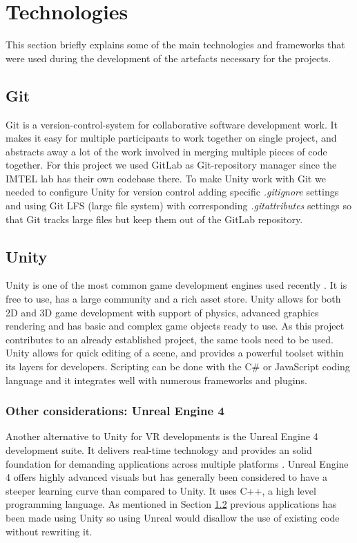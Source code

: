 \section{Technologies}
\label{sec:technologies}
This section briefly explains some of the main technologies and frameworks that were used during the development of the artefacts necessary for the projects. 

\subsection{Git}
Git is a version-control-system for collaborative software development work. It makes it easy for multiple participants to work together on single project, and abstracts away a lot of the work involved in merging multiple pieces of code together. For this project we used GitLab \cite{GitLab} as Git-repository manager since the IMTEL lab has their own codebase there. To make Unity work with Git we needed to configure Unity for version control adding specific \textit{.gitignore} settings and using Git LFS (large file system) with corresponding \textit{.gitattributes} settings so that Git tracks large files but keep them out of the GitLab repository. 

\subsection{Unity}
\label{section: untiy}
Unity is one of the most common game development engines used recently \cite{unity}. It is free to use, has a large community and a rich asset store. Unity allows for both 2D and 3D game development with support of physics, advanced graphics rendering and has basic and complex game objects ready to use. As this project contributes to an already established project, the same tools need to be used. Unity allows for quick editing of a scene, and provides a powerful toolset within its layers for developers. Scripting can be done with the C\# or JavaScript coding language and it integrates well with numerous frameworks and plugins.

\subsubsection{Other considerations: Unreal Engine 4}
Another alternative to Unity for VR developments is the Unreal Engine 4 development suite. It delivers real-time technology and provides an solid foundation for demanding applications across multiple platforms \cite{unrealEngine}. Unreal Engine 4 offers highly advanced visuals but has generally been considered to have a steeper learning curve than compared to Unity. It uses C++, a high level programming language. As mentioned in Section \ref{section: untiy} previous applications has been made using Unity so using Unreal would disallow the use of existing code without rewriting it.       

